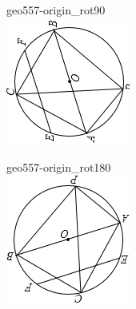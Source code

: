 \documentclass[12pt]{article}
\begin{document}
\begin{center}
\begin{minipage}{0.32\textwidth}
\end{minipage}
\hfill\begin{minipage}{0.32\textwidth}\centering
geo557-origin\_rot90\\
\includegraphics[width=0.95\linewidth]{out_rommath_origin/items/geo557-origin/assets/figure_rot90.png}
\end{minipage}
\par\medskip
\begin{minipage}{0.32\textwidth}\centering
geo557-origin\_rot180\\
\includegraphics[width=0.95\linewidth]{out_rommath_origin/items/geo557-origin/assets/figure_rot180.png}

\end{minipage}
\end{center}
\end{document}
